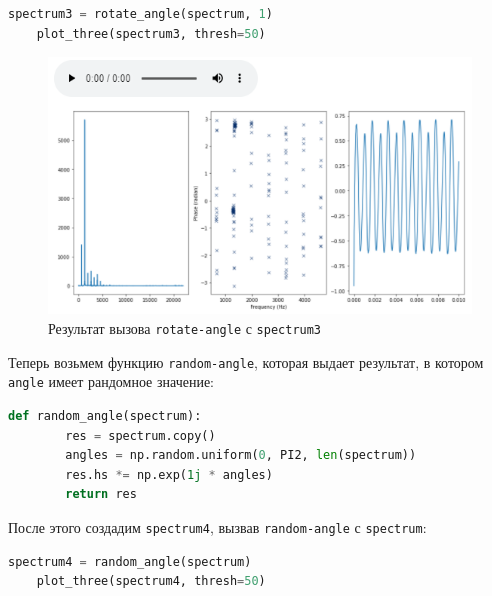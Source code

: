 \documentclass[a4paper]{article}
\begin{document}
\begin{lstlisting}[language=Python, caption= Вызов \texttt{plot-three} с \texttt{spectrum3}]
    spectrum3 = rotate_angle(spectrum, 1)
    plot_three(spectrum3, thresh=50)
\end{lstlisting} 
            
            \begin{figure}[H]
                \centering
                \includegraphics[width=\textwidth]{ex_3_spectrum3.png}
                \caption{Результат вызова \texttt{rotate-angle} с \texttt{spectrum3}}
                \label{fig:ex_3_spectrum3}
            \end{figure}
            
            Теперь возьмем функцию \texttt{random-angle}, которая выдает результат, в котором \texttt{angle} имеет рандомное значение:
            
\begin{lstlisting}[language=Python, caption= Функция \texttt{random-angle}]
    def random_angle(spectrum):
        res = spectrum.copy()
        angles = np.random.uniform(0, PI2, len(spectrum))
        res.hs *= np.exp(1j * angles)
        return res
\end{lstlisting} 
            
            После этого создадим \texttt{spectrum4}, вызвав \texttt{random-angle} с \texttt{spectrum}:
            
\begin{lstlisting}[language=Python, caption= Вызов \texttt{plot-three} с \texttt{spectrum4}]
    spectrum4 = random_angle(spectrum)
    plot_three(spectrum4, thresh=50)
\end{lstlisting} 
            
\end{document}
